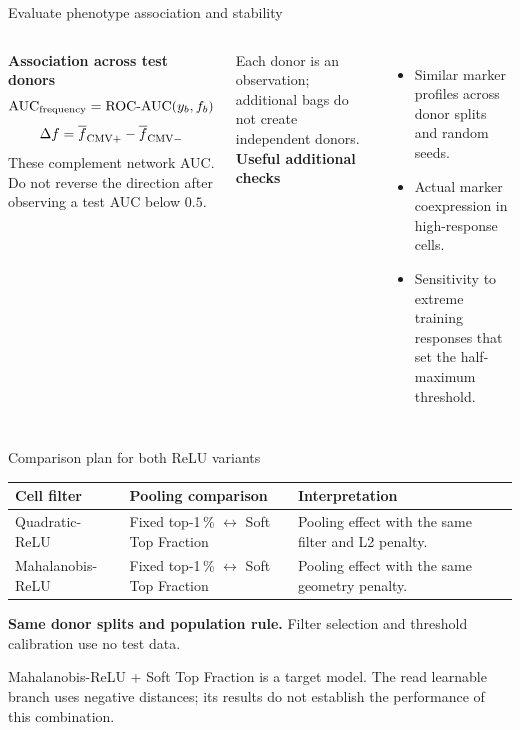 \begin{frame}{Evaluate phenotype association and stability}

\begin{columns}[T,onlytextwidth]
\textbf{Association across test donors}
\[\mathrm{AUC}_{\rm frequency}=\mathrm{ROC\text{-}AUC}(y_b,f_b)\]
\[\Delta f=\overline f_{\rm CMV+}-\overline f_{\rm CMV-}\]
\small These complement network AUC. Do not reverse the direction after observing a test AUC below $0.5$.\par
\vspace{2mm}
Each donor is an observation; additional bags do not create independent donors.
\textbf{Useful additional checks}
\begin{itemize}
\item Similar marker profiles across donor splits and random seeds.
\item Actual marker coexpression in high-response cells.
\item Sensitivity to extreme training responses that set the half-maximum threshold.
\end{itemize}
\end{columns}

\end{frame}

\begin{frame}{Comparison plan for both ReLU variants}

\renewcommand{\arraystretch}{1.4}
\begin{tabular}{@{}p{.25\linewidth}p{.34\linewidth}p{.35\linewidth}@{}}\toprule
Cell filter & Pooling comparison & Interpretation\\\midrule
Quadratic-ReLU & Fixed top-1\,\% $\leftrightarrow$ Soft Top Fraction & Pooling effect with the same filter and L2 penalty.\\
Mahalanobis-ReLU & Fixed top-1\,\% $\leftrightarrow$ Soft Top Fraction & Pooling effect with the same geometry penalty.\\\bottomrule
\end{tabular}
\vspace{3mm}
\textbf{Same donor splits and population rule.} Filter selection and threshold calibration use no test data.\par
\vspace{2mm}
\small Mahalanobis-ReLU + Soft Top Fraction is a target model. The read learnable branch uses negative distances; its results do not establish the performance of this combination.

\end{frame}

